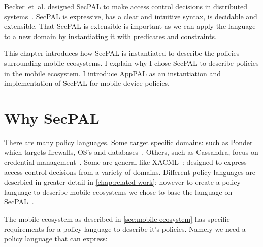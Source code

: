 \documentclass[thesis.tex]{subfiles}
\begin{document}
Becker~et~al{.} designed SecPAL to make access control decisions in distributed
systems~\cite{becker_secpal:_2010}. SecPAL is expressive, has a clear and
intuitive syntax, is decidable and extensible. That SecPAL is extensible is
important as we can apply the language to a new domain by instantiating it with
predicates and constraints.

This chapter introduces how SecPAL is instantiated to describe the policies
surrounding mobile ecosystems. I explain why I chose SecPAL to describe policies
in the mobile ecosystem. I introduce AppPAL as an instantiation and
implementation of SecPAL for mobile device policies.

\section{Why SecPAL}
\label{sec:why-apppal}

There are many policy languages. Some target specific domains: such as Ponder
which targets firewalls, OS's and databases~\cite{damianou_ponder_2001}. Others,
such as Cassandra, focus on credential management~\cite{becker_cassandra:_2004}.
Some are general like XACML~\cite{oasis_extensible_2013}: designed to express
access control decisions from a variety of domains. Different policy languages
are descrbied in greater detail in \autoref{chap:related-work}; however to
create a policy language to describe mobile ecosystems we chose to base the
language on SecPAL~\cite{becker_secpal:_2010}.

The mobile ecosystem as described in \autoref{sec:mobile-ecosystem} has specific
requirements for a policy language to describe it's policies. Namely we need a
policy language that can express:
\end{document}
